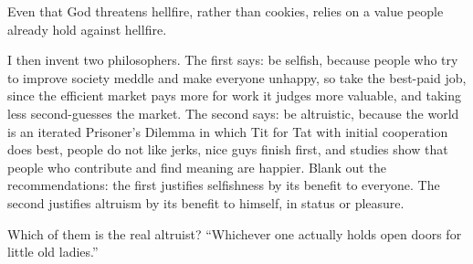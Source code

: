 Even that God threatens hellfire, rather than cookies, relies on a value people already hold against hellfire.

I then invent two philosophers. The first says: be selfish, because people who try to improve society meddle and make everyone unhappy, so take the best-paid job, since the efficient market pays more for work it judges more valuable, and taking less second-guesses the market. The second says: be altruistic, because the world is an iterated Prisoner's Dilemma in which Tit for Tat with initial cooperation does best, people do not like jerks, nice guys finish first, and studies show that people who contribute and find meaning are happier. Blank out the recommendations: the first justifies selfishness by its benefit to everyone. The second justifies altruism by its benefit to himself, in status or pleasure.

Which of them is the real altruist? ``Whichever one actually holds open doors for little old ladies.''
